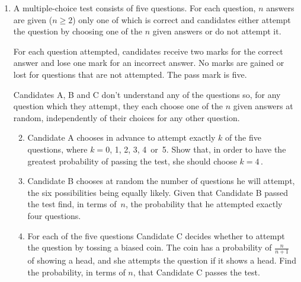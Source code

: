 \documentclass[a4, 11pt]{report}
\newlength{\qspace}
\newcounter{qnumber}
\newenvironment{question}%
 {\vspace{\qspace}
  \begin{enumerate}[\bfseries 1\quad][10]%
    \setcounter{enumi}{\value{qnumber}}%
    \item%
 }
{
  \end{enumerate}
  \filbreak
  \stepcounter{qnumber}
 }
\newenvironment{questionparts}[1][1]%
 {
  \begin{enumerate}[\bfseries (i)]%
    \setcounter{enumii}{#1}
    \addtocounter{enumii}{-1}
    \setlength{\itemsep}{5mm}
    \setlength{\parskip}{8pt}
 }
 {
  \end{enumerate}
 }
\def\ge{\geqslant}
\begin{document}
\begin{question}
A multiple-choice test consists of five questions. 
For each question, $n$ answers are given ($n\ge2$) only
one of which is correct and  candidates either
attempt the question by choosing one of the $n$ 
given answers or do
not attempt it. 

For each question attempted, candidates receive two marks for the 
correct answer
and  lose one mark for an incorrect answer. 
No marks are gained or lost for questions that are  not attempted.
The pass mark is five.

Candidates A, B and C  don't understand any of the questions 
so, for any question which they attempt, 
they each choose one of the $n$ given answers at random, 
independently of their choices for any other question.



\begin{questionparts}
\item
Candidate A  chooses in advance to attempt exactly $k$ of the five
questions, where $k=0$, 1, 2, 3, 4~or~5. 
Show that, in order to have the greatest probability of passing the test,
 she should choose $k=4\,$.                      

\item
Candidate B chooses at random  the number of questions he will attempt, 
the  six possibilities being equally likely.
Given that  Candidate B passed the test find, in terms of~$n$,  
the probability that 
he attempted exactly four questions. 


\item For each of the five questions
 Candidate C decides whether to attempt the question
 by tossing a biased  coin. The coin has a probability
of $\frac n{n+1}$ of showing a head, and she attempts the
question if it shows a head. Find the probability, in terms of $n$,
that Candidate C passes the test.

 


\end{questionparts}
\end{question}





\end{document}

